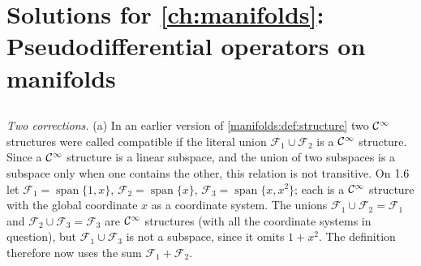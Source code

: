 \providecommand{\Gsm}{G^{-\infty}}
\providecommand{\Symq}[1]{S^{#1-[1]}}
\providecommand{\osc}[1]{\mathcal{I}[#1]}

\section{Solutions for \cref{ch:manifolds}: Pseudodifferential operators on manifolds}\label{solutions:manifolds}

\subsection*{}
\emph{Two corrections.} (a) In an earlier version of \cref{manifolds:def:structure} two
$\mathcal{C}^\infty$ structures were called compatible if the literal union $\mathcal F_1\cup\mathcal F_2$ is
a $\mathcal{C}^\infty$ structure. Since a $\mathcal{C}^\infty$ structure is a linear subspace, and the union of two
subspaces is a subspace only when one contains the other, this relation is not
transitive. On $1.6$ let $\mathcal F_1=\operatorname{span}\{1,x\}$,
$\mathcal F_2=\operatorname{span}\{x\}$, $\mathcal F_3=\operatorname{span}\{x,x^2\}$; each is a
$\mathcal{C}^\infty$ structure with the global coordinate $x$ as a coordinate system. The unions
$\mathcal F_1\cup\mathcal F_2=\mathcal F_1$ and $\mathcal F_2\cup\mathcal F_3=\mathcal F_3$ are
$\mathcal{C}^\infty$ structures (with all the coordinate systems in question), but
$\mathcal F_1\cup\mathcal F_3$ is not a subspace, since it omits $1+x^2$. The definition
therefore now uses the sum $\mathcal F_1+\mathcal F_2$.

